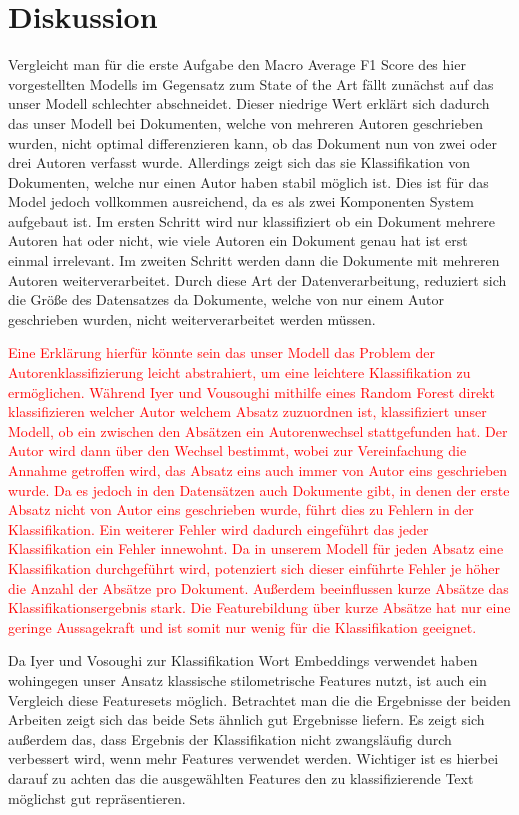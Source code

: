 \documentclass[conference]{IEEEtran}
\begin{document}
\section{Diskussion}
	Vergleicht man für die erste Aufgabe den Macro Average F1 Score des hier vorgestellten Modells im Gegensatz zum State of the Art fällt zunächst auf das unser Modell schlechter abschneidet. Dieser niedrige Wert erklärt sich dadurch das unser Modell bei Dokumenten, welche von mehreren Autoren geschrieben wurden, nicht optimal differenzieren kann, ob das Dokument nun von zwei oder drei Autoren verfasst wurde. Allerdings zeigt sich das sie Klassifikation von Dokumenten, welche nur einen Autor haben stabil möglich ist. Dies ist für das Model jedoch vollkommen ausreichend, da es als zwei Komponenten System aufgebaut ist. Im ersten Schritt wird nur klassifiziert ob ein Dokument mehrere Autoren hat oder nicht, wie viele Autoren ein Dokument genau hat ist erst einmal irrelevant. Im zweiten Schritt werden dann die Dokumente mit mehreren Autoren weiterverarbeitet. Durch diese Art der Datenverarbeitung, reduziert sich die Größe des Datensatzes da Dokumente, welche von nur einem Autor geschrieben wurden, nicht weiterverarbeitet werden müssen.
	
	\textcolor{red}{Eine Erklärung hierfür könnte sein das unser Modell das Problem der Autorenklassifizierung leicht abstrahiert, um eine leichtere Klassifikation zu ermöglichen. Während Iyer und Vousoughi mithilfe eines Random Forest direkt klassifizieren welcher Autor welchem Absatz zuzuordnen ist, klassifiziert unser Modell, ob ein zwischen den Absätzen ein Autorenwechsel stattgefunden hat. Der Autor wird dann über den Wechsel bestimmt, wobei zur Vereinfachung die Annahme getroffen wird, das Absatz eins auch immer von Autor eins geschrieben wurde. Da es jedoch in den Datensätzen auch Dokumente gibt, in denen der erste Absatz nicht von Autor eins geschrieben wurde, führt dies zu Fehlern in der Klassifikation. Ein weiterer Fehler wird dadurch eingeführt das jeder Klassifikation ein Fehler innewohnt. Da in unserem Modell für jeden Absatz eine Klassifikation durchgeführt wird, potenziert sich dieser einführte Fehler je höher die Anzahl der Absätze pro Dokument. Außerdem beeinflussen kurze Absätze das Klassifikationsergebnis stark. Die Featurebildung über kurze Absätze hat nur eine geringe Aussagekraft und ist somit nur wenig für die Klassifikation geeignet. }
	
	Da Iyer und Vosoughi zur Klassifikation Wort Embeddings verwendet haben wohingegen unser Ansatz klassische stilometrische Features nutzt, ist auch ein Vergleich diese Featuresets möglich. Betrachtet man die die Ergebnisse der beiden Arbeiten zeigt sich das beide Sets ähnlich gut Ergebnisse liefern. Es zeigt sich außerdem das, dass Ergebnis der Klassifikation nicht zwangsläufig durch verbessert wird, wenn mehr Features verwendet werden. Wichtiger ist es hierbei darauf zu achten das die ausgewählten Features den zu klassifizierende Text möglichst gut repräsentieren.
	
\end{document}

